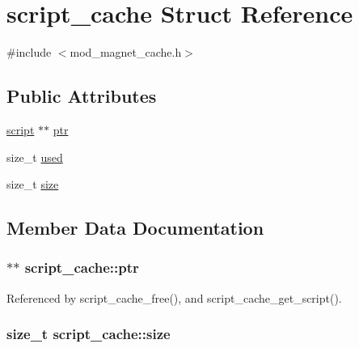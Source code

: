 \hypertarget{structscript__cache}{\section{script\-\_\-cache Struct Reference}
\label{structscript__cache}
}


{\ttfamily \#include $<$mod\-\_\-magnet\-\_\-cache.\-h$>$}

\subsection*{Public Attributes}
\begin{DoxyCompactItemize}
\item 
\hyperlink{structscript}{script} $\ast$$\ast$ \hyperlink{structscript__cache_adec71846e187e4f919145a24d009c853}{ptr}
\item 
size\-\_\-t \hyperlink{structscript__cache_a3b665d42fed0b698e9e617128baf3fd3}{used}
\item 
size\-\_\-t \hyperlink{structscript__cache_a4893c52df2fcf4848a4cc3ee8edeeaca}{size}
\end{DoxyCompactItemize}


\subsection{Member Data Documentation}
\hypertarget{structscript__cache_adec71846e187e4f919145a24d009c853}{
\subsubsection[{ptr}]{$\ast$$\ast$ script\-\_\-cache\-::ptr}}\label{structscript__cache_adec71846e187e4f919145a24d009c853}


Referenced by script\-\_\-cache\-\_\-free(), and script\-\_\-cache\-\_\-get\-\_\-script().

\hypertarget{structscript__cache_a4893c52df2fcf4848a4cc3ee8edeeaca}{
\subsubsection[{size}]{\setlength{\rightskip}{0pt plus 5cm}size\-\_\-t script\-\_\-cache\-::size}}\label{structscript__cache_a4893c52df2fcf4848a4cc3ee8edeeaca}


